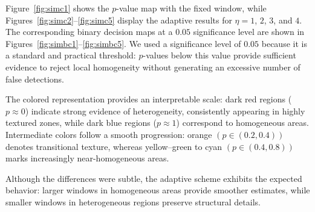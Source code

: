 \documentclass[
  lettersize  journal,
]{IEEEtran}%
\begin{document}
Figure~\ref{fig:simc1} shows the \(p\)-value map with the fixed window,
while Figures~\ref{fig:simc2}--\ref{fig:simc5} display the adaptive
results for \(\eta=1\), \(2\), \(3\), and \(4\). The corresponding
binary decision maps at a \(0.05\) significance level are shown in
Figures~\ref{fig:simbc1}--\ref{fig:simbc5}. We used a significance level
of \(0.05\) because it is a standard and practical threshold:
\(p\)-values below this value provide sufficient evidence to reject
local homogeneity without generating an excessive number of false
detections.

The colored representation provides an interpretable scale: dark red
regions (\(p \approx 0\)) indicate strong evidence of heterogeneity,
consistently appearing in highly textured zones, while dark blue regions
(\(p \approx 1\)) correspond to homogeneous areas. Intermediate colors
follow a smooth progression: orange \((p\in (0.2,0.4))\) denotes
transitional texture, whereas yellow--green to cyan \((p\in (0.4,0.8))\)
marks increasingly near-homogeneous areas.

Although the differences were subtle, the adaptive scheme exhibits the
expected behavior: larger windows in homogeneous areas provide smoother
estimates, while smaller windows in heterogeneous regions preserve
structural details.

\setlength{\dblfloatsep}{6pt}
\setlength{\dbltextfloatsep}{6pt}
\setlength{\textfloatsep}{6pt}
\captionsetup{font=footnotesize}
\captionsetup[sub]{aboveskip=2pt,belowskip=2pt}
\end{document}
